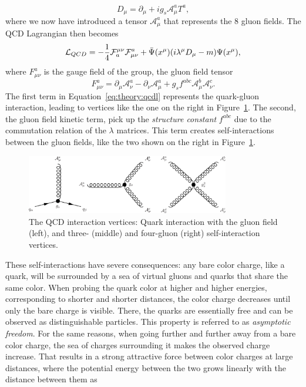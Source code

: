 \begin{equation}
  D_\mu=\partial_\mu + ig_s \mathcal{A}_{\mu}^a T^a,
\end{equation}
where we now have introduced a tensor $\mathcal{A}_{\mu}^a$ that represents the 8 gluon fields.
The QCD Lagrangian then becomes
\begin{equation}
  \label{eq:theory:qcdl}
   \mathcal{L}_{QCD} =-\frac{1}{4}{\cal F}_{a}^{\mu\nu}{\cal F}^{a}_{\mu\nu}+\bar{\Psi}(x^{\mu})(i\lambda^{\mu}D_{\mu}-m)\Psi(x^{\mu}),
\end{equation}
where $F_{\mu\nu}^a$ is the gauge field of the group, the gluon field tensor 
\begin{equation}
F_{\mu\nu}^a=\partial_{\mu} \mathcal{A}_{\nu}^a-\partial_{\nu} \mathcal{A}_{\mu}^a+g_s f^{abc}\mathcal{A}_{\mu}^b\mathcal{A}_{\nu}^c.
\end{equation}
The first term in Equation~\ref{eq:theory:qcdl} represents the quark-gluon interaction, leading to vertices like the one on the right in Figure~\ref{fig:theory:qcdint}. The second, the gluon field kinetic term, pick up the \emph{structure constant} $f^{abc}$ due to the commutation relation of the $\lambda$ matrices. This term creates self-interactions between the gluon fields, like the two shown on the right in Figure~\ref{fig:theory:qcdint}.
\begin{figure}[h!]
\centering
\includegraphics[width=0.79\textwidth]{figures/theory/QCD_vtx.pdf}
\caption{The QCD interaction vertices: Quark interaction with the gluon field (left), and three- (middle) and four-gluon (right) self-interaction vertices.}
\label{fig:theory:qcdint}
\end{figure}
These self-interactions have severe consequences: any bare color charge, like a quark, will be surrounded by a sea of virtual gluons and quarks that share the same color. When probing the quark color at higher and higher energies, corresponding to shorter and shorter distances, the color charge decreases until only the bare charge is visible. There, the quarks are essentially free and can be observed as distinguishable particles. This property is referred to as \emph{asymptotic freedom}. For the same reasons, when going further and further away from a bare color charge, the sea of charges surrounding it makes the observed charge increase. That results in a strong attractive force between color charges at large distances, where the potential energy between the two grows linearly with the distance between them as
